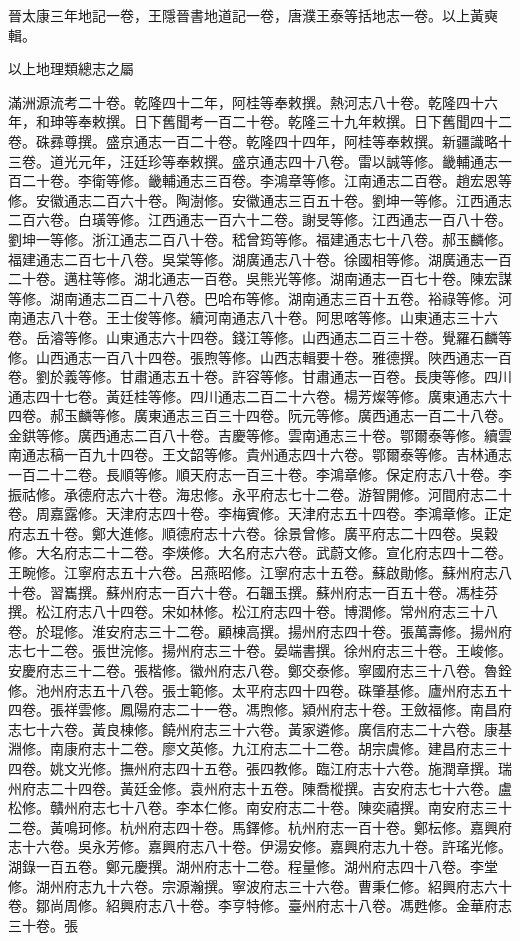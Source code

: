 \begin{pinyinscope}
晉太康三年地記一卷，王隱晉書地道記一卷，唐濮王泰等括地志一卷。以上黃奭輯。

以上地理類總志之屬

滿洲源流考二十卷。乾隆四十二年，阿桂等奉敕撰。熱河志八十卷。乾隆四十六年，和珅等奉敕撰。日下舊聞考一百二十卷。乾隆三十九年敕撰。日下舊聞四十二卷。硃彞尊撰。盛京通志一百二十卷。乾隆四十四年，阿桂等奉敕撰。新疆識略十三卷。道光元年，汪廷珍等奉敕撰。盛京通志四十八卷。雷以誠等修。畿輔通志一百二十卷。李衛等修。畿輔通志三百卷。李鴻章等修。江南通志二百卷。趙宏恩等修。安徽通志二百六十卷。陶澍修。安徽通志三百五十卷。劉坤一等修。江西通志二百六卷。白璜等修。江西通志一百六十二卷。謝旻等修。江西通志一百八十卷。劉坤一等修。浙江通志二百八十卷。嵇曾筠等修。福建通志七十八卷。郝玉麟修。福建通志二百七十八卷。吳棠等修。湖廣通志八十卷。徐國相等修。湖廣通志一百二十卷。邁柱等修。湖北通志一百卷。吳熊光等修。湖南通志一百七十卷。陳宏謀等修。湖南通志二百二十八卷。巴哈布等修。湖南通志三百十五卷。裕祿等修。河南通志八十卷。王士俊等修。續河南通志八十卷。阿思喀等修。山東通志三十六卷。岳濬等修。山東通志六十四卷。錢江等修。山西通志二百三十卷。覺羅石麟等修。山西通志一百八十四卷。張煦等修。山西志輯要十卷。雅德撰。陜西通志一百卷。劉於義等修。甘肅通志五十卷。許容等修。甘肅通志一百卷。長庚等修。四川通志四十七卷。黃廷桂等修。四川通志二百二十六卷。楊芳燦等修。廣東通志六十四卷。郝玉麟等修。廣東通志三百三十四卷。阮元等修。廣西通志一百二十八卷。金鉷等修。廣西通志二百八十卷。吉慶等修。雲南通志三十卷。鄂爾泰等修。續雲南通志稿一百九十四卷。王文韶等修。貴州通志四十六卷。鄂爾泰等修。吉林通志一百二十二卷。長順等修。順天府志一百三十卷。李鴻章修。保定府志八十卷。李振祜修。承德府志六十卷。海忠修。永平府志七十二卷。游智開修。河間府志二十卷。周嘉露修。天津府志四十卷。李梅賓修。天津府志五十四卷。李鴻章修。正定府志五十卷。鄭大進修。順德府志十六卷。徐景曾修。廣平府志二十四卷。吳穀修。大名府志二十二卷。李煐修。大名府志六卷。武蔚文修。宣化府志四十二卷。王畹修。江寧府志五十六卷。呂燕昭修。江寧府志十五卷。蘇啟勛修。蘇州府志八十卷。習巂撰。蘇州府志一百六十卷。石韞玉撰。蘇州府志一百五十卷。馮桂芬撰。松江府志八十四卷。宋如林修。松江府志四十卷。博潤修。常州府志三十八卷。於琨修。淮安府志三十二卷。顧棟高撰。揚州府志四十卷。張萬壽修。揚州府志七十二卷。張世浣修。揚州府志三十卷。晏端書撰。徐州府志三十卷。王峻修。安慶府志三十二卷。張楷修。徽州府志八卷。鄭交泰修。寧國府志三十八卷。魯銓修。池州府志五十八卷。張士範修。太平府志四十四卷。硃肇基修。廬州府志五十四卷。張祥雲修。鳳陽府志二十一卷。馮煦修。潁州府志十卷。王斂福修。南昌府志七十六卷。黃良棟修。饒州府志三十六卷。黃家遴修。廣信府志二十六卷。康基淵修。南康府志十二卷。廖文英修。九江府志二十二卷。胡宗虞修。建昌府志三十四卷。姚文光修。撫州府志四十五卷。張四教修。臨江府志十六卷。施潤章撰。瑞州府志二十四卷。黃廷金修。袁州府志十五卷。陳喬樅撰。吉安府志七十六卷。盧松修。贛州府志七十八卷。李本仁修。南安府志二十卷。陳奕禧撰。南安府志三十二卷。黃鳴珂修。杭州府志四十卷。馬鐸修。杭州府志一百十卷。鄭枟修。嘉興府志十六卷。吳永芳修。嘉興府志八十卷。伊湯安修。嘉興府志九十卷。許瑤光修。湖錄一百五卷。鄭元慶撰。湖州府志十二卷。程量修。湖州府志四十八卷。李堂修。湖州府志九十六卷。宗源瀚撰。寧波府志三十六卷。曹秉仁修。紹興府志六十卷。鄒尚周修。紹興府志八十卷。李亨特修。臺州府志十八卷。馮甦修。金華府志三十卷。張
\end{pinyinscope}
